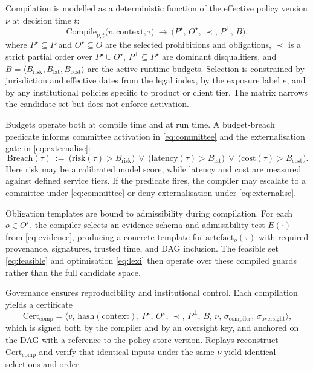 \documentclass[oneside,10pt]{swissi}
\begin{document}
Compilation is modelled as a deterministic function of the effective policy version \(\nu\) at decision time \(t\):
\begin{equation}
\mathrm{Compile}_{\nu,t}\bigl(v,\text{context},\tau\bigr)\ \to\ \bigl(P^{\star},\,O^{\star},\,\prec,\,P^{\perp},\,B\bigr),
\label{eq:compile}
\end{equation}
where \(P^{\star}\subseteq P\) and \(O^{\star}\subseteq O\) are the selected prohibitions and obligations, \(\prec\) is a strict partial order over \(P^{\star}\cup O^{\star}\), \(P^{\perp}\subseteq P^{\star}\) are dominant disqualifiers, and \(B=\langle B_{\mathrm{risk}},B_{\mathrm{lat}},B_{\mathrm{cost}}\rangle\) are the active runtime budgets. Selection is constrained by jurisdiction and effective dates from the legal index, by the exposure label \(e\), and by any institutional policies specific to product or client tier. The matrix narrows the candidate set but does not enforce activation.

Budgets operate both at compile time and at run time. A budget-breach predicate informs committee activation in \eqref{eq:committee} and the externalisation gate in \eqref{eq:externalise}:
\begin{equation}
\mathrm{Breach}(\tau)\ :=\ \bigl(\mathrm{risk}(\tau) > B_{\mathrm{risk}}\bigr)\ \lor\ \bigl(\mathrm{latency}(\tau) > B_{\mathrm{lat}}\bigr)\ \lor\ \bigl(\mathrm{cost}(\tau) > B_{\mathrm{cost}}\bigr).
\label{eq:breach}
\end{equation}
Here risk may be a calibrated model score, while latency and cost are measured against defined service tiers. If the predicate fires, the compiler may escalate to a committee under \eqref{eq:committee} or deny externalisation under \eqref{eq:externalise}.

Obligation templates are bound to admissibility during compilation. For each \(o\in O^{\star}\), the compiler selects an evidence schema and admissibility test \(E(\cdot)\) from \eqref{eq:evidence}, producing a concrete template for \(\mathrm{artefact}_o(\tau)\) with required provenance, signatures, trusted time, and DAG inclusion. The feasible set \eqref{eq:feasible} and optimisation \eqref{eq:lexi} then operate over these compiled guards rather than the full candidate space.

Governance ensures reproducibility and institutional control. Each compilation yields a certificate
\begin{equation}
\mathrm{Cert}_{\mathrm{comp}}=\bigl\langle v,\,\mathrm{hash}(\text{context}),\,P^{\star},\,O^{\star},\,\prec,\,P^{\perp},\,B,\,\nu,\,\sigma_{\mathrm{compiler}},\,\sigma_{\mathrm{oversight}}\bigr\rangle,
\label{eq:cert}
\end{equation}
which is signed both by the compiler and by an oversight key, and anchored on the DAG with a reference to the policy store version. Replays reconstruct \(\mathrm{Cert}_{\mathrm{comp}}\) and verify that identical inputs under the same \(\nu\) yield identical selections and order.
\end{document}
